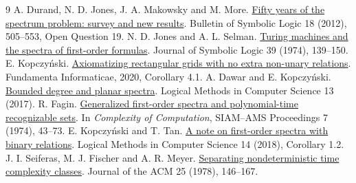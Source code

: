 \documentclass[11pt]{article}
\begin{document}
\begin{thebibliography}{9}
 A. Durand, N. D. Jones, J. A. Makowsky and M. More. \href{https://doi.org/10.2178/bsl.1804020}{Fifty years of the spectrum problem: survey and new results}. Bulletin of Symbolic Logic 18 (2012), 505--553, Open Question 19.
 N. D. Jones and A. L. Selman. \href{https://doi.org/10.2307/2272354}{Turing machines and the spectra of first-order formulas}. Journal of Symbolic Logic 39 (1974), 139--150.
 E. Kopczyński. \href{https://doi.org/10.3233/FI-2020-1966}{Axiomatizing rectangular grids with no extra non-unary relations}. Fundamenta Informaticae, 2020, Corollary 4.1.
 A. Dawar and E. Kopczyński. \href{https://doi.org/10.23638/LMCS-13(4:6)2017}{Bounded degree and planar spectra}. Logical Methods in Computer Science 13 (2017).
 R. Fagin. \href{https://www.cs.umd.edu/~gasarch/COURSES/752/S25/slides/genspec.pdf}{Generalized first-order spectra and polynomial-time recognizable sets}. In \emph{Complexity of Computation}, SIAM--AMS Proceedings 7 (1974), 43--73.
 E. Kopczyński and T. Tan. \href{https://www.csie.ntu.edu.tw/~tonytan/research/2018-lmcs-spec-3var.pdf}{A note on first-order spectra with binary relations}. Logical Methods in Computer Science 14 (2018), Corollary 1.2.
 J. I. Seiferas, M. J. Fischer and A. R. Meyer. \href{https://doi.org/10.1145/322047.322061}{Separating nondeterministic time complexity classes}. Journal of the ACM 25 (1978), 146--167.
\end{thebibliography}
\end{document}
